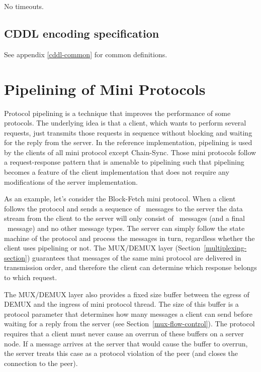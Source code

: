 No timeouts.

\subsection{CDDL encoding specification}

See appendix \ref{cddl-common} for common definitions.

\section{Pipelining of Mini Protocols}
\label{pipelining}
Protocol pipelining is a technique that improves the performance of some protocols.
The underlying idea is that a client, which wants to perform several requests,
just transmits those requests in sequence without blocking and waiting for the reply from the server.
In the reference implementation, pipelining is used by the clients of all mini protocol except Chain-Sync.
Those mini protocols follow a request-response pattern that is amenable to pipelining such
that pipelining becomes a feature of the client implementation that does not require any
modifications of the server implementation.

As an example, let's consider the Block-Fetch mini protocol.
When a client follows the protocol and sends a sequence of \MsgRequestRange~messages to the server
the data stream from the client to the server will only consist of \MsgRequestRange~messages
(and a final \MsgClientDone~message) and no other message types.
The server can simply follow the state machine of the protocol and process the messages in turn,
regardless whether the client uses pipelining or not.
The MUX/DEMUX layer (Section~\ref{multiplexing-section}) guarantees
that messages of the same mini protocol are delivered in transmission order,
and therefore the client can determine which response belongs to which request.

The MUX/DEMUX layer also provides a fixed size buffer between the egress of DEMUX and the ingress
of mini protocol thread.
The size of this buffer is a protocol parameter that determines how many messages
a client can send before waiting for a reply from the server (see Section~\ref{mux-flow-control}).
The protocol requires that a client must never cause an overrun of these buffers on a server node.
If a message arrives at the server that would cause the buffer to overrun,
the server treats this case as a protocol violation of the peer
(and closes the connection to the peer).

